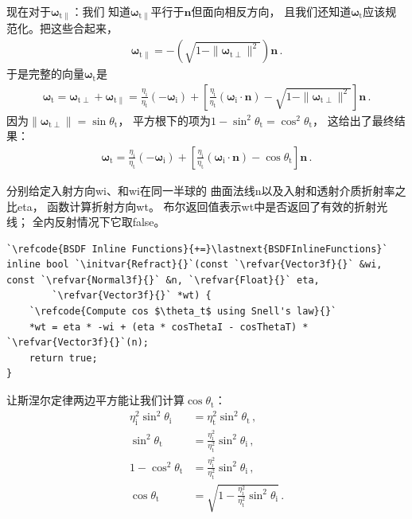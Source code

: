 现在对于${\bm\omega}_{\mathrm{t}\parallel}$：我们
知道${\bm\omega}_{\mathrm{t}\parallel}$平行于$\bm n$但面向相反方向，
且我们还知道${\bm\omega}_{\mathrm{t}}$应该规范化。把这些合起来，
\begin{align*}
    {\bm\omega}_{\mathrm{t}\parallel}=-\left(\sqrt{1-\|{\bm\omega}_{\mathrm{t}\perp}\|^2}\right){\bm n}\, .
\end{align*}
于是完整的向量${\bm\omega}_{\mathrm{t}}$是
\begin{align*}
    {\bm\omega}_{\mathrm{t}}={\bm\omega}_{\mathrm{t}\perp}+{\bm\omega}_{\mathrm{t}\parallel}=\frac{\eta_{\mathrm{i}}}{\eta_{\mathrm{t}}}(-{\bm\omega}_{\mathrm{i}})+\left[\frac{\eta_{\mathrm{i}}}{\eta_{\mathrm{t}}}({\bm\omega}_{\mathrm{i}}\cdot{\bm n})-\sqrt{1-\|{\bm\omega}_{\mathrm{t}\perp}\|^2}\right]{\bm n}\, .
\end{align*}
因为$\|{\bm\omega}_{\mathrm{t}\perp}\|=\sin\theta_{\mathrm{t}}$，
平方根下的项为$1-\sin^2\theta_{\mathrm{t}}=\cos^2\theta_{\mathrm{t}}$，
这给出了最终结果：
\begin{align}
    \label{eq:8.8}
    {\bm\omega}_{\mathrm{t}}=\frac{\eta_{\mathrm{i}}}{\eta_{\mathrm{t}}}(-{\bm\omega}_{\mathrm{i}})+\left[\frac{\eta_{\mathrm{i}}}{\eta_{\mathrm{t}}}({\bm\omega}_{\mathrm{i}}\cdot{\bm n})-\cos\theta_{\mathrm{t}}\right]{\bm n}\, .
\end{align}

分别给定入射方向{\ttfamily wi}、和{\ttfamily wi}在同一半球的
曲面法线{\ttfamily n}以及入射和透射介质折射率之比{\ttfamily eta}，
函数计算折射方向{\ttfamily wt}。
布尔返回值表示{\ttfamily *wt}中是否返回了有效的折射光线；
全内反射情况下它取{\ttfamily false}。
\begin{lstlisting}
`\refcode{BSDF Inline Functions}{+=}\lastnext{BSDFInlineFunctions}`
inline bool `\initvar{Refract}{}`(const `\refvar{Vector3f}{}` &wi, const `\refvar{Normal3f}{}` &n, `\refvar{Float}{}` eta,
        `\refvar{Vector3f}{}` *wt) {
    `\refcode{Compute cos $\theta_t$ using Snell's law}{}`
    *wt = eta * -wi + (eta * cosThetaI - cosThetaT) * `\refvar{Vector3f}{}`(n);
    return true;
}
\end{lstlisting}

让斯涅尔定律两边平方能让我们计算$\cos\theta_{\mathrm{t}}$：
\begin{align*}
    \eta_{\mathrm{i}}^2\sin^2\theta_{\mathrm{i}} & =\eta_{\mathrm{t}}^2\sin^2\theta_{\mathrm{t}}\, ,                                      \\
    \sin^2\theta_{\mathrm{t}}                    & =\frac{\eta_{\mathrm{i}}^2}{\eta_{\mathrm{t}}^2}\sin^2\theta_{\mathrm{i}}\, ,          \\
    1-\cos^2\theta_{\mathrm{t}}                  & =\frac{\eta_{\mathrm{i}}^2}{\eta_{\mathrm{t}}^2}\sin^2\theta_{\mathrm{i}}\, ,          \\
    \cos\theta_{\mathrm{t}}                      & =\sqrt{1-\frac{\eta_{\mathrm{i}}^2}{\eta_{\mathrm{t}}^2}\sin^2\theta_{\mathrm{i}}}\, .
\end{align*}

